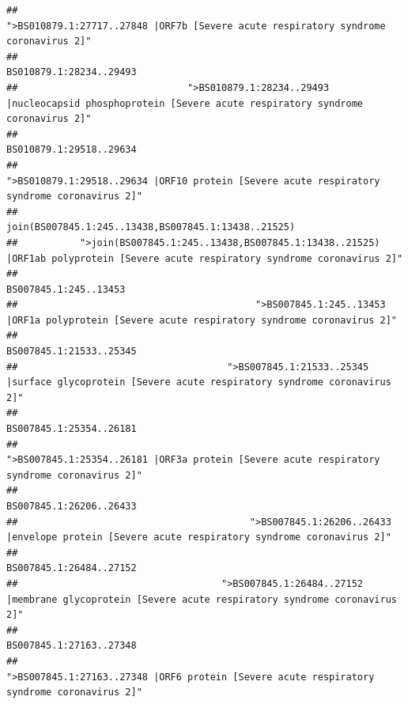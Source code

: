 \documentclass[
]{article}
\begin{document}
\begin{verbatim}
##                                                    ">BS010879.1:27717..27848 |ORF7b [Severe acute respiratory syndrome coronavirus 2]" 
##                                                                                                                BS010879.1:28234..29493 
##                              ">BS010879.1:28234..29493 |nucleocapsid phosphoprotein [Severe acute respiratory syndrome coronavirus 2]" 
##                                                                                                                BS010879.1:29518..29634 
##                                            ">BS010879.1:29518..29634 |ORF10 protein [Severe acute respiratory syndrome coronavirus 2]" 
##                                                                                    join(BS007845.1:245..13438,BS007845.1:13438..21525) 
##           ">join(BS007845.1:245..13438,BS007845.1:13438..21525) |ORF1ab polyprotein [Severe acute respiratory syndrome coronavirus 2]" 
##                                                                                                                  BS007845.1:245..13453 
##                                          ">BS007845.1:245..13453 |ORF1a polyprotein [Severe acute respiratory syndrome coronavirus 2]" 
##                                                                                                                BS007845.1:21533..25345 
##                                     ">BS007845.1:21533..25345 |surface glycoprotein [Severe acute respiratory syndrome coronavirus 2]" 
##                                                                                                                BS007845.1:25354..26181 
##                                            ">BS007845.1:25354..26181 |ORF3a protein [Severe acute respiratory syndrome coronavirus 2]" 
##                                                                                                                BS007845.1:26206..26433 
##                                         ">BS007845.1:26206..26433 |envelope protein [Severe acute respiratory syndrome coronavirus 2]" 
##                                                                                                                BS007845.1:26484..27152 
##                                    ">BS007845.1:26484..27152 |membrane glycoprotein [Severe acute respiratory syndrome coronavirus 2]" 
##                                                                                                                BS007845.1:27163..27348 
##                                             ">BS007845.1:27163..27348 |ORF6 protein [Severe acute respiratory syndrome coronavirus 2]" 

\end{verbatim}
\end{document}
